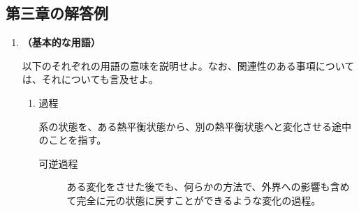 \documentclass[uplatex,dvipdfmx,a4paper,11pt]{jsarticle}
\begin{document}
\begin{appendix}
\begin{enumerate}
%
%
%
%
%
%

\end{enumerate}

\newpage


\subsection{第三章の解答例}

\begin{enumerate}

\item
{\bf （基本的な用語）}

以下のそれぞれの用語の意味を説明せよ。なお、関連性のある事項については、それについても言及せよ。

\begin{enumerate}

\item
過程

系の状態を、ある熱平衡状態から、別の熱平衡状態へと変化させる途中のことを指す。

\begin{description}
\item[可逆過程]
ある変化をさせた後でも、何らかの方法で、外界への影響も含めて完全に元の状態に戻すことができるような変化の過程。


\end{description}
\end{enumerate}
\end{enumerate}
\end{appendix}
\end{document}
